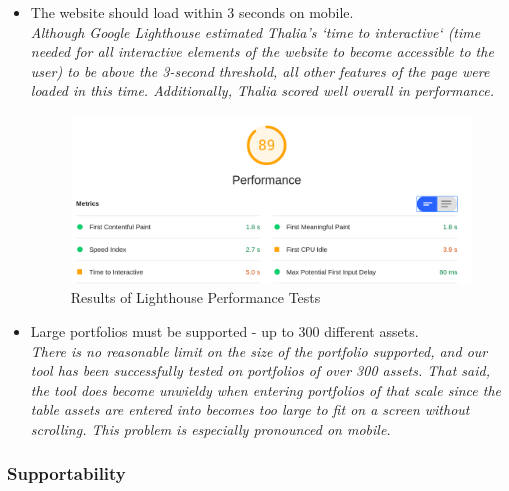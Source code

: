 \documentclass[main.tex]{subfiles}
\begin{document}
\begin{itemize}
    \item The website should load within 3 seconds on mobile.\\
    \textit{Although Google Lighthouse estimated Thalia’s `time to interactive` (time needed for all interactive elements of the website to become accessible to the user) to be above the 3-second threshold, all other features of the page were loaded in this time. Additionally, Thalia scored well overall in performance.}
    
    
    \begin{figure}[H]
       \centering
       \includegraphics[scale=0.3]{07Evaluation/07Pictures/performanceLighthouse.png}
       \caption{Results of Lighthouse Performance Tests}
       \label{LighthousePerf}
    \end{figure}
    
    \item Large portfolios must be supported - up to 300 different assets.\\
    \textit{There is no reasonable limit on the size of the portfolio supported, and our tool has been successfully tested on portfolios of over 300 assets. That said, the tool does become unwieldy when entering portfolios of that scale since the table assets are entered into becomes too large to fit on a screen without scrolling. This problem is especially pronounced on mobile.}

\end{itemize}

\subsubsection{Supportability}
\end{document}
